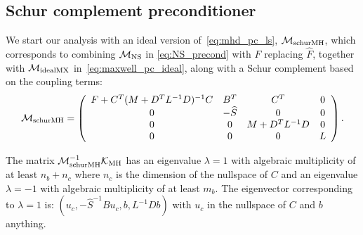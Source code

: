 \documentclass{article}
\begin{document}
\subsection{Schur complement preconditioner}

We start our analysis with an ideal version of~\eqref{eq:mhd_pc_ls}, $\mathcal{M}_{\rm schurMH}$, which corresponds
to combining ${\mathcal M}_{\rm NS}$ in \eqref{eq:NS_precond} with $F$ replacing $\widehat{F}$, together with ${\mathcal M}_{\rm idealMX}$ in~\eqref{eq:maxwell_pc_ideal}, along with a Schur complement based on the coupling terms: %
\begin{equation} 
\label{eq:mhd_pc_schur}
\mathcal{M}_{\rm schurMH} =
\left(
\begin{array}{cccc}
  F + C^T ( M + D^T L^{-1} D)^{-1} C  & B^T & C^T & 0\\
0 & -\widehat{S} & 0 & 0 \\
0 & 0 & M + D^T L^{-1} D & 0\\
0 & 0 & 0 & L
\end{array}
\right).
\end{equation}


\begin{theorem}
\label{thm:mhd_outer_schur}
The matrix $\mathcal{M}_{\rm schurMH}^{-1} \mathcal{K}_{\rm MH} $ has an eigenvalue $\lambda = 1$ with algebraic multiplicity of at least $n_b+n_c$ where $n_c$ is the dimension of the nullspace of $C$ and an eigenvalue $\lambda = -1$ with  algebraic multiplicity of at least $m_b$. The eigenvector corresponding to $\lambda=1$ is: $(u_c, -\widehat{S}^{-1}B u_c, b, L^{-1} D b)$ with $u_c$ in the nullspace of $C$ and $b$ anything.
\end{theorem}
\end{document}
